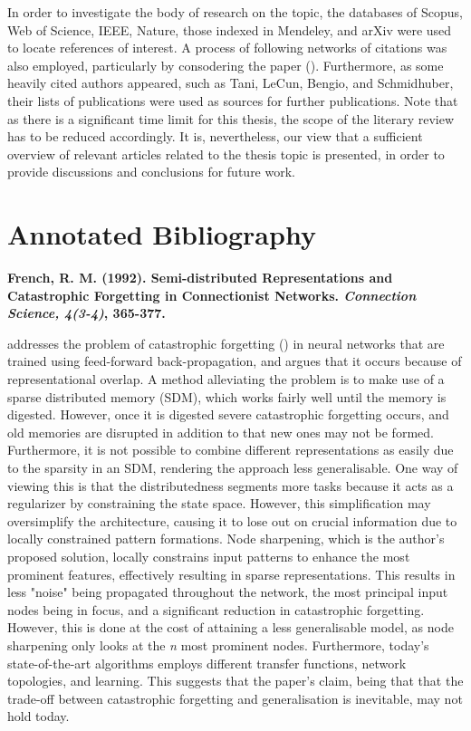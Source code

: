 In order to investigate the body of research on the topic, the databases of Scopus, Web of Science, IEEE, Nature, those indexed in Mendeley, and arXiv were used to locate references of interest. A process of following networks of citations was also employed, particularly by consodering the paper (\cite{McClelland1995}). Furthermore, as some heavily cited authors appeared, such as Tani, LeCun, Bengio, and Schmidhuber, their lists of publications were used as sources for further publications. Note that as there is a significant time limit for this thesis, the scope of the literary review has to be reduced accordingly. It is, nevertheless, our view that a sufficient overview of relevant articles related to the thesis topic is presented, in order to provide discussions and conclusions for future work.

\section{Annotated Bibliography}\label{annotated_bibliography}

\textbf{French, R. M. (1992). Semi-distributed Representations and Catastrophic Forgetting in Connectionist Networks.\textit{ Connection Science, 4(3-4)}, 365-377.}

\cite{French1992} addresses the problem of catastrophic forgetting (\cite{McCloskey1989, Ratcliff1990}) in neural networks that are trained using feed-forward back-propagation, and argues that it occurs because of representational overlap. A method alleviating the problem is to make use of a sparse distributed memory (SDM), which works fairly well until the memory is digested. However, once it is digested severe catastrophic forgetting occurs, and old memories are disrupted in addition to that new ones may not be formed. Furthermore, it is not possible to combine different representations as easily due to the sparsity in an SDM, rendering the approach less generalisable. One way of viewing this is that the distributedness segments more tasks because it acts as a regularizer by constraining the state space. However, this simplification may oversimplify the architecture, causing it to lose out on crucial information due to locally constrained pattern formations. Node sharpening, which is the author's proposed solution, locally constrains input patterns to enhance the most prominent features, effectively resulting in sparse representations. This results in less "noise" being propagated throughout the network, the most principal input nodes being in focus, and a significant reduction in catastrophic forgetting. However, this is done at the cost of attaining a less generalisable model, as node sharpening only looks at the \textit{n} most prominent nodes. Furthermore, today's state-of-the-art algorithms employs different transfer functions, network topologies, and learning. This suggests that the paper's claim, being that that the trade-off between catastrophic forgetting and generalisation is inevitable, may not hold today.


